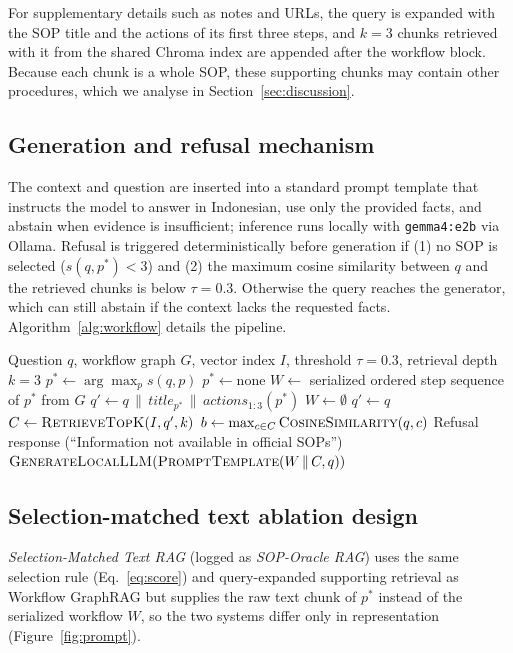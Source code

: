 \documentclass[preprint,10pt]{elsarticle}
\begin{document}
For supplementary details such as notes and URLs, the query is expanded with the SOP title and the actions of its first three steps, and $k=3$ chunks retrieved with it from the shared Chroma index are appended after the workflow block. Because each chunk is a whole SOP, these supporting chunks may contain other procedures, which we analyse in Section~\ref{sec:discussion}.

\subsection{Generation and refusal mechanism}
The context and question are inserted into a standard prompt template that instructs the model to answer in Indonesian, use only the provided facts, and abstain when evidence is insufficient; inference runs locally with \texttt{gemma4:e2b} via Ollama. Refusal is triggered deterministically before generation if (1) no SOP is selected ($s(q,p^\ast)<3$) and (2) the maximum cosine similarity between $q$ and the retrieved chunks is below $\tau=0.3$. Otherwise the query reaches the generator, which can still abstain if the context lacks the requested facts. Algorithm~\ref{alg:workflow} details the pipeline.

\begin{algorithm}[!htbp]
\caption{Execution pipeline of Process-Aware Workflow GraphRAG}
\label{alg:workflow}
\begin{algorithmic}[1]
\REQUIRE Question $q$, workflow graph $G$, vector index $I$, threshold $\tau = 0.3$, retrieval depth $k=3$
\STATE $p^\ast \leftarrow \arg\max_p s(q,p)$ 
  \STATE $p^\ast \leftarrow \text{none}$
\ENDIF
{}
  \STATE $W \leftarrow$ serialized ordered step sequence of $p^\ast$ from $G$
  \STATE $q' \leftarrow q \,\|\, \textit{title}_{p^\ast} \,\|\, \textit{actions}_{1:3}(p^\ast)$ 
\ELSE
  \STATE $W \leftarrow \emptyset$
  \STATE $q' \leftarrow q$ 
\ENDIF
\STATE $C \leftarrow \textsc{RetrieveTopK}(I, q', k)$
\STATE $b \leftarrow \max_{c \in C} \textsc{CosineSimilarity}(q, c)$
  \RETURN Refusal response (``Information not available in official SOPs'')
\ENDIF
\RETURN $\textsc{GenerateLocalLLM}(\textsc{PromptTemplate}(W \,\|\, C, q))$
\end{algorithmic}
\end{algorithm}

\subsection{Selection-matched text ablation design}
\label{sec:ablation-oracle}
\emph{Selection-Matched Text RAG} (logged as \emph{SOP-Oracle RAG}) uses the same selection rule (Eq.~\eqref{eq:score}) and query-expanded supporting retrieval as Workflow GraphRAG but supplies the raw text chunk of $p^\ast$ instead of the serialized workflow $W$, so the two systems differ only in representation (Figure~\ref{fig:prompt}).
\end{document}
